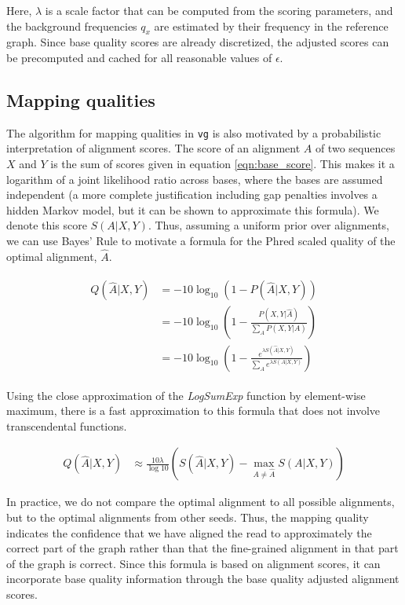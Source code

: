 Here, $\lambda$ is a scale factor that can be computed from the scoring parameters, and the background frequencies $q_x$ are estimated by their frequency in the reference graph. Since base quality scores are already discretized, the adjusted scores can be precomputed and cached for all reasonable values of $\epsilon$. 

\subsection{Mapping qualities}

The algorithm for mapping qualities in {\tt vg} is also motivated by a probabilistic interpretation of alignment scores.
The score of an alignment $A$ of two sequences $X$ and $Y$ is the sum of scores given in equation \ref{eqn:base_score}.
This makes it a logarithm of a joint likelihood ratio across bases, where the bases are assumed independent (a more complete justification including gap penalties involves a hidden Markov model, but it can be shown to approximate this formula).
We denote this score $S(A|X,Y)$.
Thus, assuming a uniform prior over alignments, we can use Bayes' Rule to motivate a formula for the Phred scaled quality of the optimal alignment, $\hat A$.

\begin{align}
\begin{split}
    Q(\hat A|X,Y) &= -10\log_{10}(1 - P(\hat A|X,Y)) \\
    &= -10 \log_{10}\left(1 - \frac{P(X,Y|\hat A)}{\sum_{A}P(X,Y|A)} \right) \\
    &= -10 \log_{10}\left(1 - \frac{e^{\lambda S(\hat A|X,Y)}}{\sum_{A}e^{\lambda S(A|X,Y)}} \right) \label{basicqualityscore}
\end{split}
\end{align}

Using the close approximation of the \emph{LogSumExp} function by element-wise maximum, there is a fast approximation to this formula that does not involve transcendental functions.

\begin{align}
    Q(\hat A|X,Y) &\approx \frac{10\lambda}{\log 10}\left( S(\hat A | X,Y) - \max_{A \neq \hat A}S(A| X,Y)\right)
\end{align}

In practice, we do not compare the optimal alignment to all possible alignments, but to the optimal alignments from other seeds. Thus, the mapping quality indicates the confidence that we have aligned the read to approximately the correct part of the graph rather than that the fine-grained alignment in that part of the graph is correct. Since this formula is based on alignment scores, it can incorporate base quality information through the base quality adjusted alignment scores.


